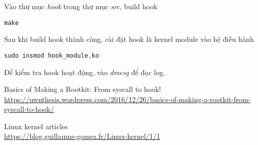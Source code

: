 \documentclass[12pt]{article}
\begin{document}
Vào thư mục \textit{hook} trong thư mục \textit{src}, build hook
\begin{lstlisting}
make
\end{lstlisting}

Sau khi build hook thành công, cài đặt hook là kernel module vào hệ điều hành
\begin{lstlisting}
sudo insmod hook_module.ko
\end{lstlisting}

Để kiểm tra hook hoạt động, vào \textit{dmesg} để đọc log.

\begin{thebibliography}{9}

 Basics of Making a Rootkit: From syscall to hook! \\
\url{https://uwnthesis.wordpress.com/2016/12/26/basics-of-making-a-rootkit-from-syscall-to-hook/}

 Linux kernel articles \\
\url{https://blog.guillaume-gomez.fr/Linux-kernel/1/1}

\end{thebibliography}
\end{document}
